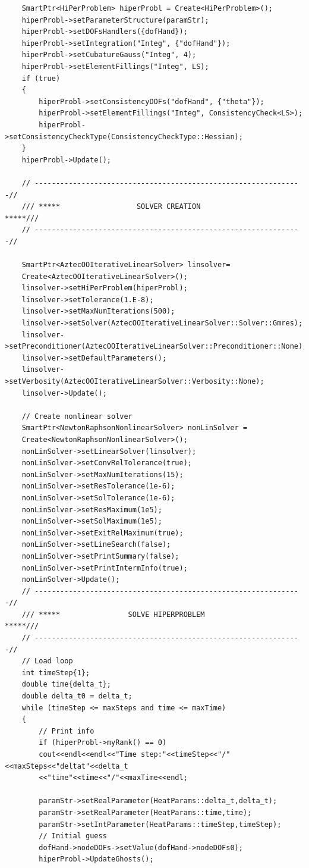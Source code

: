 \documentclass[]{article}
\begin{document}
\begin{lstlisting}
	SmartPtr<HiPerProblem> hiperProbl = Create<HiPerProblem>();
	hiperProbl->setParameterStructure(paramStr);
	hiperProbl->setDOFsHandlers({dofHand});
	hiperProbl->setIntegration("Integ", {"dofHand"});
	hiperProbl->setCubatureGauss("Integ", 4);
	hiperProbl->setElementFillings("Integ", LS);
	if (true)
	{
		hiperProbl->setConsistencyDOFs("dofHand", {"theta"});
		hiperProbl->setElementFillings("Integ", ConsistencyCheck<LS>);
		hiperProbl->setConsistencyCheckType(ConsistencyCheckType::Hessian);
	}
	hiperProbl->Update();
	
	// ---------------------------------------------------------------//
	/// *****                  SOLVER CREATION                  *****///
	// ---------------------------------------------------------------//
	
	SmartPtr<AztecOOIterativeLinearSolver> linsolver= 
	Create<AztecOOIterativeLinearSolver>();
	linsolver->setHiPerProblem(hiperProbl);
	linsolver->setTolerance(1.E-8);
	linsolver->setMaxNumIterations(500);
	linsolver->setSolver(AztecOOIterativeLinearSolver::Solver::Gmres);
	linsolver->setPreconditioner(AztecOOIterativeLinearSolver::Preconditioner::None);
	linsolver->setDefaultParameters();
	linsolver->setVerbosity(AztecOOIterativeLinearSolver::Verbosity::None);
	linsolver->Update();
	
	// Create nonlinear solver
	SmartPtr<NewtonRaphsonNonlinearSolver> nonLinSolver = 
	Create<NewtonRaphsonNonlinearSolver>();
	nonLinSolver->setLinearSolver(linsolver);
	nonLinSolver->setConvRelTolerance(true);
	nonLinSolver->setMaxNumIterations(15);
	nonLinSolver->setResTolerance(1e-6);
	nonLinSolver->setSolTolerance(1e-6);
	nonLinSolver->setResMaximum(1e5);
	nonLinSolver->setSolMaximum(1e5);
	nonLinSolver->setExitRelMaximum(true);
	nonLinSolver->setLineSearch(false);
	nonLinSolver->setPrintSummary(false);
	nonLinSolver->setPrintIntermInfo(true);
	nonLinSolver->Update();
	// ---------------------------------------------------------------//
	/// *****                SOLVE HIPERPROBLEM                 *****///
	// ---------------------------------------------------------------//
	// Load loop
	int timeStep{1};
	double time{delta_t};
	double delta_t0 = delta_t;
	while (timeStep <= maxSteps and time <= maxTime)
	{
		// Print info
		if (hiperProbl->myRank() == 0)
		cout<<endl<<endl<<"Time step:"<<timeStep<<"/"<<maxSteps<<"deltat"<<delta_t
		<<"time"<<time<<"/"<<maxTime<<endl;
		
		paramStr->setRealParameter(HeatParams::delta_t,delta_t);
		paramStr->setRealParameter(HeatParams::time,time);
		paramStr->setIntParameter(HeatParams::timeStep,timeStep);
		// Initial guess
		dofHand->nodeDOFs->setValue(dofHand->nodeDOFs0);
		hiperProbl->UpdateGhosts();
		

\end{lstlisting}
\end{document}
